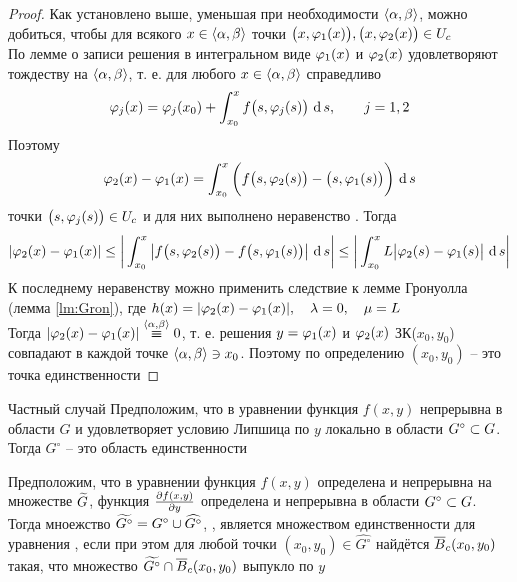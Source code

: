 \begin{proof}
    Как установлено выше, уменьшая при необходимости $ \braket{\alpha, \beta} $, можно добиться, чтобы для всякого $ x \in \braket{\alpha, \beta} $ точки $ \big( x, \vphi_1(x) \big), \big( x, \vphi_2(x) \big) \in U_c $ \\
    По лемме о записи решения в интегральном виде $ \vphi_1(x) $ и $ \vphi_2(x) $ удовлетворяют тождеству  на $ \braket{\alpha, \beta} $, т. е. для любого $ x \in \braket{\alpha, \beta} $ справедливо
    $$ \vphi_j(x) = \vphi_j(x_0) + \dint[s]{x_0}x{f \big( s, \vphi_j(s) \big)}, \qquad j = 1, 2 $$
    Поэтому
    $$ \vphi_2(x) - \vphi_1(x) = \dint[s]{x_0}x{\bigg( f \big( s, \vphi_2(s) \big) -  \big( s, \vphi_1(s) \big) \bigg)} $$
    точки $ \big( s, \vphi_j(s) \big) \in U_c $ и для них выполнено неравенство . Тогда
    $$ |\vphi_2(x) - \vphi_1(x)| \le \bigg| \dint[s]{x_0}x{\big| f \big( s, \vphi_2(s) \big) - f \big( s, \vphi_1(s) \big) \big|} \bigg| \le \bigg| \dint[s]{x_0}x{L \big| \vphi_2(s) - \vphi_1(s) \big|} \bigg| $$
    К последнему неравенству можно применить следствие к лемме Гронуолла (лемма \ref{lm:Gron}), где $ h(x) = |\vphi_2(x) - \vphi_1(x)|, \quad \lambda = 0, \quad \mu = L $ \\
    Тогда $ |\vphi_2(x) - \vphi_1(x)| \overset{\braket{\alpha, \beta}}\equiv 0 $, т. е. решения $ y = \vphi_1(x) $ и $ \vphi_2(x) $ ЗК($ x_0, y_0 $) совпадают в каждой точке $ \braket{\alpha, \beta} \ni x_0 $. Поэтому по определению $ (x_0, y_0) $ -- это точка единственности
\end{proof}

\begin{undefthm}{Частный случай}
    Предположим, что в уравнении  функция $ f(x, y) $ непрерывна в области $ G $ и удовлетворяет условию Липшица по $ y $ локально в области $ G^\circ \sub G $. \\
    Тогда $ G^\circ $ -- это область единственности
\end{undefthm}

\begin{theorem}
    Предположим, что в уравнении  функция $ f(x, y) $ определена и непрерывна на множестве $ \vawe{G} $, функция $ \pder{f(x, y)}y $ определена и непрерывна в области $ G^\circ \sub G $. \\
    Тогда мноежство $ \vawe{G^\circ} = G^\circ \cup \hat{G^\circ} $, , является множеством единственности для уравнения , если при этом для любой точки $ (x_0, y_0) \in \hat{G^\circ} $ найдётся $ \ol{B}_c(x_0, y_0) $ такая, что множество $ \vawe{G^\circ} \cap \ol{B}_c(x_0, y_0) $ выпукло по $ y $
\end{theorem}

